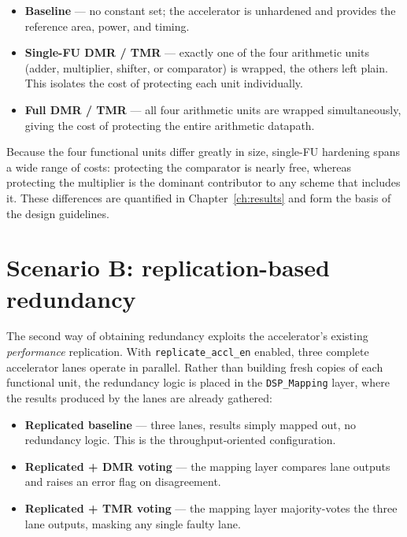 \begin{itemize}
  \item \textbf{Baseline} --- no constant set; the accelerator is unhardened and
        provides the reference area, power, and timing.
  \item \textbf{Single-FU DMR / TMR} --- exactly one of the four arithmetic
        units (adder, multiplier, shifter, or comparator) is wrapped, the others
        left plain. This isolates the cost of protecting each unit individually.
  \item \textbf{Full DMR / TMR} --- all four arithmetic units are wrapped
        simultaneously, giving the cost of protecting the entire arithmetic
        datapath.
\end{itemize}

Because the four functional units differ greatly in size, single-FU hardening
spans a wide range of costs: protecting the comparator is nearly free, whereas
protecting the multiplier is the dominant contributor to any scheme that
includes it. These differences are quantified in Chapter~\ref{ch:results} and
form the basis of the design guidelines.

\section{Scenario B: replication-based redundancy}
\label{sec:ft-scenarioA}

The second way of obtaining redundancy exploits the accelerator's existing
\emph{performance} replication. With \texttt{replicate\_accl\_en} enabled, three
complete accelerator lanes operate in parallel. Rather than building fresh
copies of each functional unit, the redundancy logic is placed in the
\texttt{DSP\_Mapping} layer, where the results produced by the lanes are already
gathered:

\begin{itemize}
  \item \textbf{Replicated baseline} --- three lanes, results simply mapped out,
        no redundancy logic. This is the throughput-oriented configuration.
  \item \textbf{Replicated + DMR voting} --- the mapping layer compares lane
        outputs and raises an error flag on disagreement.
  \item \textbf{Replicated + TMR voting} --- the mapping layer majority-votes the
        three lane outputs, masking any single faulty lane.
\end{itemize}

